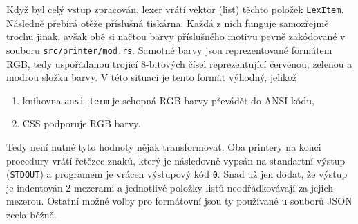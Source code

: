\documentclass[11pt, letterpaper]{article}
\begin{document}
Když byl celý vstup zpracován, lexer vrátí vektor (list) těchto položek \texttt{LexItem}. Následně přebírá otěže příslušná tiskárna. Každá z nich funguje samozřejmě trochu jinak, avšak obě si načtou barvy příslušného motivu pevně zakódované v souboru \texttt{src/printer/mod.rs}. Samotné barvy jsou reprezentované formátem RGB, tedy uspořádanou trojicí 8-bitových čísel reprezentující červenou, zelenou a modrou složku barvy. V této situaci je tento formát výhodný, jelikož
\begin{enumerate}
    \item knihovna \texttt{ansi\_term} je schopná RGB barvy převádět do ANSI kódu,
    \item CSS podporuje RGB barvy.
\end{enumerate}

Tedy není nutné tyto hodnoty nějak transformovat. Oba printery na konci procedury vrátí řetězec znaků, který je následovně vypsán na standartní výstup (\texttt{STDOUT}) a programem je vrácen výstupový kód \texttt{0}. Snad už jen dodat, že výstup je indentován 2 mezerami a jednotlivé položky listů neodřádkovávají za jejich mezerou. Ostatní možné volby pro formátovní jsou ty používané u souborů JSON zcela běžně.
\end{document}
